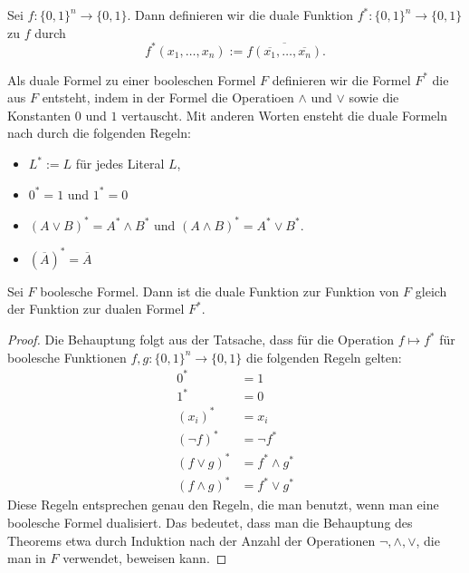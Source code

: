 \begin{defn}
	Sei $f : \{0,1\}^n \to \{0,1\}$. Dann definieren wir die duale Funktion $f^\ast : \{0,1\}^n \to \{0,1\}$ zu $f$ durch 
	\[
	f^\ast(x_1,\ldots,x_n) := \overline{ f(\overline{x_1},\ldots,\overline{x_n})}. 
	\]
\end{defn} 


\begin{defn}
	Als duale Formel zu einer booleschen Formel $F$ definieren wir die Formel $F^\ast$ die aus $F$ entsteht, indem in der Formel die Operatioen $\wedge$ und $\vee$ sowie die Konstanten $0$ und $1$ vertauscht. Mit anderen Worten ensteht die duale Formeln nach durch die folgenden Regeln:
	\begin{itemize} 
		\item $L^\ast := L$ für jedes Literal $L$, 
		\item $0^\ast = 1$ und $1^\ast = 0$ 
		\item $(A \vee B)^\ast = A^\ast \wedge B^\ast$ und $(A \wedge B)^\ast = A^\ast \vee B^\ast$.
		\item $(\overline{A})^\ast = \overline{A}$
	\end{itemize}  
\end{defn} 

\begin{thm}
	Sei $F$ boolesche Formel. Dann ist die duale Funktion zur Funktion von $F$ gleich der Funktion zur dualen Formel $F^\ast$. 
\end{thm}
\begin{proof} 
	Die Behauptung folgt aus der Tatsache, dass für die Operation $f \mapsto f^\ast$ für boolesche Funktionen $f,g : \{0,1\}^n \to \{0,1\}$ die folgenden Regeln gelten: 
	\begin{align*}
		0^\ast & = 1
		\\ 1^\ast & = 0
		\\ (x_i)^\ast & = x_i
		\\ (\neg{f})^\ast & = \neg{f^\ast}
		\\ (f \vee g)^\ast & = f ^\ast\wedge g^\ast
		\\ (f \wedge g)^\ast & = f ^\ast\vee g^\ast
	\end{align*} 
	Diese Regeln entsprechen genau den Regeln, die man benutzt, wenn man eine boolesche Formel dualisiert. Das bedeutet, dass man die Behauptung des Theorems etwa durch Induktion nach der Anzahl der Operationen $\neg, \wedge, \vee$, die man in $F$ verwendet, beweisen kann. 
\end{proof} 



